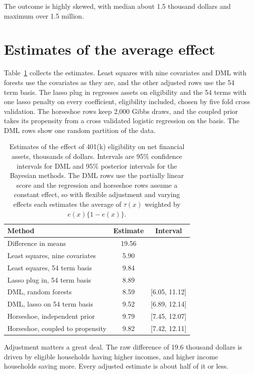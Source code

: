 The outcome is highly skewed, with median about 1.5 thousand dollars and maximum over 1.5 million. 

\section{Estimates of the average effect}

Table~\ref{tab:k401} collects the estimates. Least squares with nine covariates and DML with forests use the covariates as they are, and the other adjusted rows use the 54 term basis. The lasso plug in regresses assets on eligibility and the 54 terms with one lasso penalty on every coefficient, eligibility included, chosen by five fold cross validation. The horseshoe rows keep 2,000 Gibbs draws, and the coupled prior takes its propensity from a cross validated logistic regression on the basis. The DML rows show one random partition of the data.

\begin{table}[ht]
\centering
\caption{Estimates of the effect of 401(k) eligibility on net financial assets, thousands of dollars. Intervals are 95\% confidence intervals for DML and 95\% posterior intervals for the Bayesian methods. The DML rows use the partially linear score and the regression and horseshoe rows assume a constant effect, so with flexible adjustment and varying effects each estimates the average of $\tau(x)$ weighted by $e(x)\{1 - e(x)\}$.}
\label{tab:k401}
\small
\begin{tabular}{lcc}
\toprule
Method & Estimate & Interval \\
\midrule
Difference in means & 19.56 & \\
Least squares, nine covariates & 5.90 & \\
Least squares, 54 term basis & 9.84 & \\
Lasso plug in, 54 term basis & 8.89 & \\
DML, random forests & 8.59 & [6.05, 11.12] \\
DML, lasso on 54 term basis & 9.52 & [6.89, 12.14] \\
Horseshoe, independent prior & 9.79 & [7.45, 12.07] \\
Horseshoe, coupled to propensity & 9.82 & [7.42, 12.11] \\
\bottomrule
\end{tabular}
\end{table}

Adjustment matters a great deal. The raw difference of 19.6 thousand dollars is driven by eligible households having higher incomes, and higher income households saving more. Every adjusted estimate is about half of it or less.

